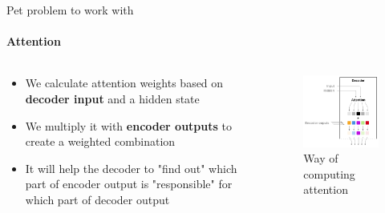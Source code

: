 \documentclass{beamer}
\begin{document}
\begin{frame}{Pet problem to work with}
\framesubtitle{Attention}

\begin{columns}
\begin{column}{0.5\textwidth}
    \begin{itemize}
    \item We calculate attention weights based on \textbf{decoder input} and a hidden state
    
    \item We multiply it with \textbf{encoder outputs} to create a weighted combination
    
    \item It will help the decoder to "find out" which part of encoder output is "responsible" for which part of decoder output  
    
    \end{itemize}   
\end{column}
\begin{column}{0.5\textwidth}  %
\begin{figure}
\includegraphics[width = .9\textwidth]{images/attention-weights.png}
\caption{Way of computing attention\footnotemark[8]}
\end{figure}{}
\end{column}
\end{columns}


\end{frame}
\end{document}
